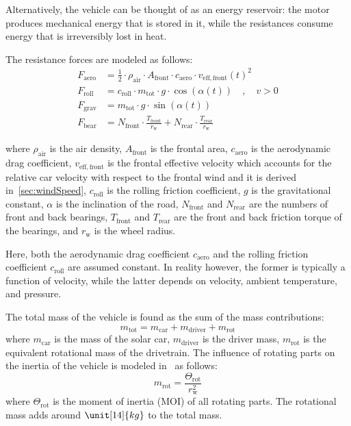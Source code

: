 Alternatively, the vehicle can be thought of as an energy reservoir: the motor produces mechanical energy that is stored in it, while the resistances consume energy that is irreversibly lost in heat.

The resistance forces are modeled as follows:
\begin{align}
	F_\mathrm{aero} &= \frac{1}{2} \cdot \rho_\mathrm{air} \cdot A_\mathrm{front} \cdot c_\mathrm{aero} \cdot v_\mathrm{eff,front}(t)^2 \\
	F_\mathrm{roll} &= c_\mathrm{roll} \cdot m_\mathrm{tot} \cdot g \cdot \cos(\alpha(t)) \quad , \quad v > 0 \\
	F_\mathrm{grav} &= m_\mathrm{tot} \cdot g \cdot \sin(\alpha(t)) \\
	F_\mathrm{bear} &= N_\mathrm{front} \cdot \frac{T_\mathrm{front}}{r_\mathrm{w}} + N_\mathrm{rear} \cdot \frac{T_\mathrm{rear}}{r_\mathrm{w}}
\end{align}


where $\rho_\mathrm{air}$ is the air density, $A_\mathrm{front}$ is the frontal area, $c_\mathrm{aero}$ is the aerodynamic drag coefficient, $v_\mathrm{eff,front}$ is the frontal effective velocity which accounts for the relative car velocity with respect to the frontal wind and it is derived in~\cref{sec:windSpeed}, $c_\mathrm{roll}$ is the rolling friction coefficient, $g$ is the gravitational constant, $\alpha$ is the inclination of the road, $N_\mathrm{front}$ and $N_\mathrm{rear}$ are the numbers of front and back bearings, $T_\mathrm{front}$ and $T_\mathrm{rear}$ are the front and back friction torque of the bearings, and $r_\mathrm{w}$ is the wheel radius.

Here, both the aerodynamic drag coefficient $c_\mathrm{aero}$ and the rolling friction coefficient $c_\mathrm{roll}$ are assumed constant. In reality however, the former is typically a function of velocity, while the latter depends on velocity, ambient temperature, and pressure.

The total mass of the vehicle is found as the sum of the mass contributions:
\begin{equation}
	m_\mathrm{tot} = m_\mathrm{car} + m_\mathrm{driver} + m_\mathrm{rot}
\end{equation}
where $m_\mathrm{car}$ is the mass of the solar car, $m_\mathrm{driver}$ is the driver mass, $m_\mathrm{rot}$ is the equivalent rotational mass of the drivetrain. The influence of rotating parts on the inertia of the vehicle is modeled in~\cite{optimalEnergyManagement:2000book, vps:2007book} as follows:
\begin{equation}
	m_\mathrm{rot} = \frac{\Theta_\mathrm{rot}}{r_\mathrm{w}^2}
\end{equation}
where $\Theta_\mathrm{rot}$ is the moment of inertia (MOI) of all rotating parts. The rotational mass adds around $\unit[14]{kg}$ to the total mass.

